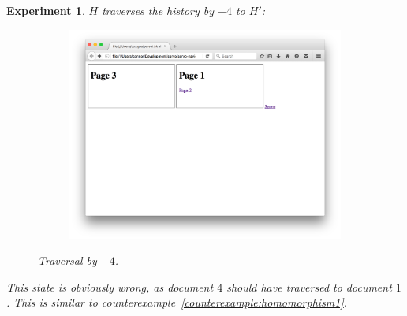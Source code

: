 \documentclass{article}
\newcommand{\aNH}{H}
\newtheorem{experiment}{Experiment}
\begin{document}
\begin{experiment}
  \emph{$\aNH$ traverses the history by $-4$ to $\aNH'$}:
  \begin{figure}[H]
    \begin{subfigure}{0.65\textwidth}
      \includegraphics[width=\linewidth]{images/experiments/forwardback4/firefox/6.png}
    \end{subfigure}
    \begin{subfigure}{0.25\textwidth}
    \end{subfigure}
    \caption{Traversal by $-4$.}
    \label{fig:traverseback4}
  \end{figure}

  This state is obviously wrong, as document $4$ should have traversed to document $1$.
  This is similar to counterexample~\ref{counterexample:homomorphism1}.


\end{experiment}
\end{document}

